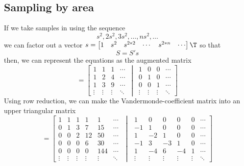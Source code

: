 \documentclass{article}
\begin{document}
\subsection{Sampling by area}
If we take samples in using the sequence
\[s^2, 2s^2, 3s^2,\dots, ns^2,\dots\]
we can factor out a vector \(s = \left[\begin{matrix} 1 & s^2 & s^{2*2} & \cdots & s^{2*n} & \cdots \end{matrix}\right]\T\)
so that
\[S=S's\]
then, we can represent the equations as the augmented matrix
\begin{equation}
	[S'\vert I]=\left[ \begin{matrix}1 & 1 & 1 & \cdots \\ 1 & 2 & 4 & \cdots\\	1 & 3 & 9 & \cdots\\ \vdots & \vdots & \vdots & \ddots \end{matrix}\,\middle\vert\,\begin{matrix}1 & 0 & 0 & \cdots \\ 0 & 1 & 0 & \cdots \\ 0 & 0 & 1 & \cdots \\ \vdots & \vdots & \vdots & \ddots\end{matrix}\right]
\end{equation}
Using row reduction, we can make the Vandermonde-coefficient matrix into an upper triangular matrix
\begin{equation}
	[T\vert C]=\left[\begin{matrix} 1 & 1 & 1 & 1 & 1 & \cdots \\
			0 & 1 & 3 & 7 & 15 &\cdots \\
			0 & 0 & 2 & 12 & 50 &\cdots \\
			0 & 0 & 0 & 6 & 30 & \cdots \\
			0 & 0 & 0 & 0 & 144 & \cdots \\
		\vdots & \vdots & \vdots & \vdots & \vdots & \ddots \end{matrix}
		\,\,\middle\vert\,\,\begin{matrix}
			1 & 0 & 0 & 0 & 0 & \cdots \\
			-1 & 1 & 0 & 0 & 0 & \cdots \\
			1 & -2 & 1 & 0 & 0 & \cdots \\
			-1 & 3 & -3 & 1 & 0 & \cdots \\
			1 & -4 & 6 & -4 & 1 & \cdots \\
			\vdots & \vdots & \vdots & \vdots & \vdots & \ddots
	\end{matrix}\right]
\end{equation}
\end{document}

